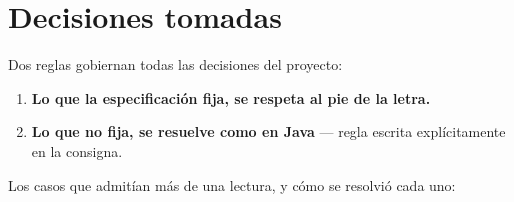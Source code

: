\documentclass[11pt,a4paper]{article}
\begin{document}
\section{Decisiones tomadas}

Dos reglas gobiernan todas las decisiones del proyecto:

\begin{enumerate}[leftmargin=1.6em]
\item \textbf{Lo que la especificación fija, se respeta al pie de la letra.}
\item \textbf{Lo que no fija, se resuelve como en Java} --- regla escrita explícitamente en la
  consigna.
\end{enumerate}

\medskip
Los casos que admitían más de una lectura, y cómo se resolvió cada uno:
\end{document}
